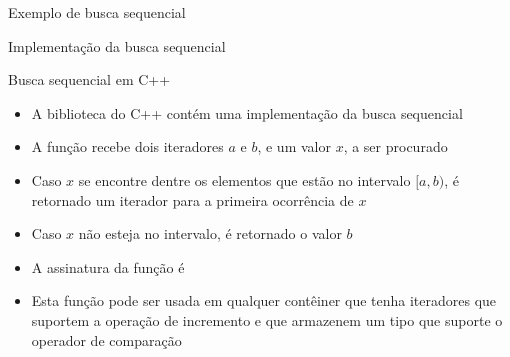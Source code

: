 \begin{frame}[fragile]{Exemplo de busca sequencial}


\end{frame}

\begin{frame}[fragile]{Implementação da busca sequencial}
\end{frame}

\begin{frame}[fragile]{Busca sequencial em C++}

    \begin{itemize}
        \item A biblioteca  do C++ contém uma implementação da busca
            sequencial

        \item A função  recebe dois iteradores $a$ e $b$, e um valor $x$, a
            ser procurado

        \item Caso $x$ se encontre dentre os elementos que estão no intervalo $[a, b)$, é
            retornado um iterador para a primeira ocorrência de $x$

        \item Caso $x$ não esteja no intervalo, é retornado o valor $b$

        \item A assinatura da função  é

        \item Esta função pode ser usada em qualquer contêiner que tenha iteradores que suportem
            a operação de incremento e que armazenem um tipo que suporte o operador de
            comparação 
    \end{itemize}

\end{frame}

